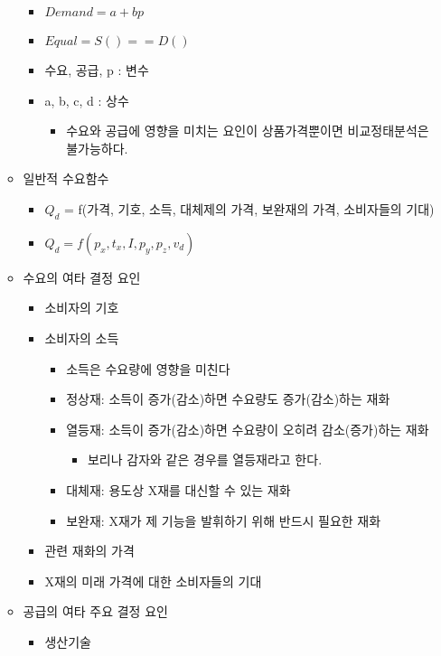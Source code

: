 \documentclass{report}
\begin{document}
\begin{itemize}
\begin{itemize}
\begin{itemize}
        \item $Demand=a+bp$
        \item $Equal = S() == D()$
        \item 수요, 공급, p : 변수
        \item a, b, c, d : 상수
        \begin{itemize}
            \item 수요와 공급에 영향을 미치는 요인이 상품가격뿐이면 비교정태분석은 불가능하다.
        \end{itemize}
    \end{itemize}
    \item 일반적 수요함수
    \begin{itemize}
        \item $Q_d$ = f(가격, 기호, 소득, 대체제의 가격, 보완재의 가격, 소비자들의 기대)
        \item $Q_d = f(p_x, t_x, I, p_y, p_z, v_d)$
    \end{itemize}
    \item 수요의 여타 결정 요인
    \begin{itemize}
        \item 소비자의 기호
        \item 소비자의 소득
        \begin{itemize}
            \item 소득은 수요량에 영향을 미친다
            \item 정상재: 소득이 증가(감소)하면 수요량도 증가(감소)하는 재화
            \item 열등재: 소득이 증가(감소)하면 수요량이 오히려 감소(증가)하는 재화
            \begin{itemize}
                \item 보리나 감자와 같은 경우를 열등재라고 한다.
            \end{itemize}
            \item 대체재: 용도상 X재를 대신할 수 있는 재화
            \item 보완재: X재가 제 기능을 발휘하기 위해 반드시 필요한 재화
        \end{itemize}
        \item 관련 재화의 가격
        \item X재의 미래 가격에 대한 소비자들의 기대
    \end{itemize}
    \item 공급의 여타 주요 결정 요인
    \begin{itemize}
        \item 생산기술

\end{itemize}
\end{itemize}
\end{itemize}
\end{document}
